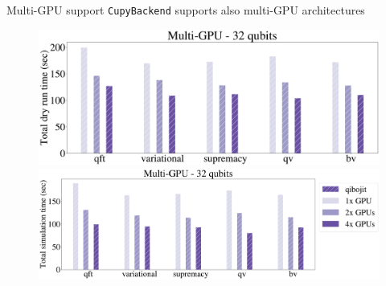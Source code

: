 \documentclass[11p,aspectratio=169]{beamer}
\begin{document}
\begin{frame}{Multi-GPU support}
    \texttt{CupyBackend} supports also multi-GPU architectures

    \begin{figure}
        \includegraphics[height= 0.4 \textheight]{figures/multigpu_32qubits_total_dry_time_double.pdf}
        \includegraphics[height= 0.315 \textheight]{figures/multigpu_32qubits_total_simulation_time_double.pdf}
    \end{figure}
\end{frame}


\end{document}
